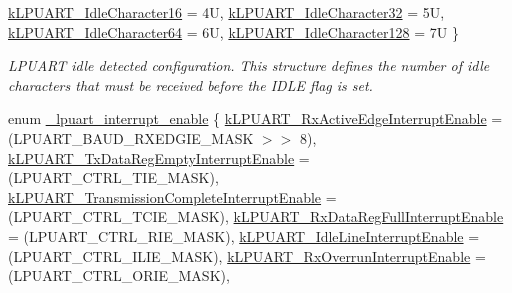 \begin{DoxyCompactItemize}
\mbox{\hyperlink{group__lpuart__driver_gga13c97cefe85629e606de5281d4eef25bace45d3af9a0c590f053df7bb00e6582a}{k\+L\+P\+U\+A\+R\+T\+\_\+\+Idle\+Character16}} = 4U, 
\mbox{\hyperlink{group__lpuart__driver_gga13c97cefe85629e606de5281d4eef25ba1daee04c54b7e37ca5e7331a3e1e7374}{k\+L\+P\+U\+A\+R\+T\+\_\+\+Idle\+Character32}} = 5U, 
\mbox{\hyperlink{group__lpuart__driver_gga13c97cefe85629e606de5281d4eef25bac497a53ed2755d26961f3b72fbd180ed}{k\+L\+P\+U\+A\+R\+T\+\_\+\+Idle\+Character64}} = 6U, 
\mbox{\hyperlink{group__lpuart__driver_gga13c97cefe85629e606de5281d4eef25ba4e080722efa87475f1710f5524e50c67}{k\+L\+P\+U\+A\+R\+T\+\_\+\+Idle\+Character128}} = 7U
 \}
\begin{DoxyCompactList}\small\item\em L\+P\+U\+A\+RT idle detected configuration. This structure defines the number of idle characters that must be received before the I\+D\+LE flag is set. \end{DoxyCompactList}\item 
enum \mbox{\hyperlink{group__lpuart__driver_ga199a157d391291a9d003bf23954f9603}{\+\_\+lpuart\+\_\+interrupt\+\_\+enable}} \{ \newline
\mbox{\hyperlink{group__lpuart__driver_gga199a157d391291a9d003bf23954f9603a43750aac20f72535350c1ab4a1862a3a}{k\+L\+P\+U\+A\+R\+T\+\_\+\+Rx\+Active\+Edge\+Interrupt\+Enable}} = (L\+P\+U\+A\+R\+T\+\_\+\+B\+A\+U\+D\+\_\+\+R\+X\+E\+D\+G\+I\+E\+\_\+\+M\+A\+SK $>$$>$ 8), 
\mbox{\hyperlink{group__lpuart__driver_gga199a157d391291a9d003bf23954f9603a0e8bf389f65e5f86a3063dc55b8aae1c}{k\+L\+P\+U\+A\+R\+T\+\_\+\+Tx\+Data\+Reg\+Empty\+Interrupt\+Enable}} = (L\+P\+U\+A\+R\+T\+\_\+\+C\+T\+R\+L\+\_\+\+T\+I\+E\+\_\+\+M\+A\+SK), 
\mbox{\hyperlink{group__lpuart__driver_gga199a157d391291a9d003bf23954f9603a0b7f783393a61cce88eab28307e9fe14}{k\+L\+P\+U\+A\+R\+T\+\_\+\+Transmission\+Complete\+Interrupt\+Enable}} = (L\+P\+U\+A\+R\+T\+\_\+\+C\+T\+R\+L\+\_\+\+T\+C\+I\+E\+\_\+\+M\+A\+SK), 
\mbox{\hyperlink{group__lpuart__driver_gga199a157d391291a9d003bf23954f9603a5b4a0893c98bf79d0dad88aeb7714d22}{k\+L\+P\+U\+A\+R\+T\+\_\+\+Rx\+Data\+Reg\+Full\+Interrupt\+Enable}} = (L\+P\+U\+A\+R\+T\+\_\+\+C\+T\+R\+L\+\_\+\+R\+I\+E\+\_\+\+M\+A\+SK), 
\newline
\mbox{\hyperlink{group__lpuart__driver_gga199a157d391291a9d003bf23954f9603af3f83c56032b14e50a682857dd7c152d}{k\+L\+P\+U\+A\+R\+T\+\_\+\+Idle\+Line\+Interrupt\+Enable}} = (L\+P\+U\+A\+R\+T\+\_\+\+C\+T\+R\+L\+\_\+\+I\+L\+I\+E\+\_\+\+M\+A\+SK), 
\mbox{\hyperlink{group__lpuart__driver_gga199a157d391291a9d003bf23954f9603a8a29c714eaa6acab06a87314f4f29636}{k\+L\+P\+U\+A\+R\+T\+\_\+\+Rx\+Overrun\+Interrupt\+Enable}} = (L\+P\+U\+A\+R\+T\+\_\+\+C\+T\+R\+L\+\_\+\+O\+R\+I\+E\+\_\+\+M\+A\+SK), 
$$
\end{DoxyCompactItemize}
